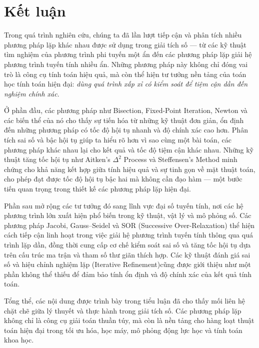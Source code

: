 \chapter*{Kết luận}
\label{chap:conclusion}

Trong quá trình nghiên cứu, chúng ta đã lần lượt tiếp cận và phân tích 
nhiều phương pháp lặp khác nhau được sử dụng trong giải tích số — từ các kỹ thuật tìm nghiệm của phương trình phi tuyến một ẩn đến các phương pháp lặp giải hệ phương trình tuyến tính nhiều ẩn.  
Những phương pháp này không chỉ đóng vai trò là công cụ tính toán hiệu quả, mà còn thể hiện tư tưởng nền tảng của toán học tính toán hiện đại: 
\textit{dùng quá trình xấp xỉ có kiểm soát để tiệm cận dần đến nghiệm chính xác}.

Ở phần đầu, các phương pháp như Bisection, Fixed-Point Iteration, Newton và các biến thể của nó cho thấy sự tiến hóa từ những kỹ thuật đơn giản, ổn định đến những phương pháp có tốc độ hội tụ nhanh và độ chính xác cao hơn.
Phân tích sai số và bậc hội tụ giúp ta hiểu rõ hơn vì sao cùng một bài toán, các phương pháp khác nhau lại cho kết quả và tốc độ tiệm cận khác nhau.  
Những kỹ thuật tăng tốc hội tụ như Aitken’s $\Delta^2$ Process và Steffensen’s Method minh chứng cho khả năng kết hợp giữa tính hiệu quả và sự tinh gọn về mặt thuật toán, cho phép đạt được tốc độ hội tụ bậc hai mà không cần đạo hàm — một bước tiến quan trọng trong thiết kế các phương pháp lặp hiện đại.

Phần sau mở rộng các tư tưởng đó sang lĩnh vực đại số tuyến tính,
nơi các hệ phương trình lớn xuất hiện phổ biến trong kỹ thuật, vật lý và mô phỏng số.
Các phương pháp Jacobi, Gauss–Seidel và SOR (Successive Over-Relaxation) 
thể hiện cách tiếp cận linh hoạt trong việc giải hệ phương trình tuyến tính thông qua quá trình lặp dần, đồng thời cung cấp cơ chế kiểm soát sai số và tăng tốc hội tụ dựa trên cấu trúc ma trận và tham số thư giãn thích hợp.
Các kỹ thuật đánh giá sai số và hiệu chỉnh nghiệm lặp (Iterative Refinement)cũng được giới thiệu như một phần không thể thiếu để đảm bảo tính ổn định và độ chính xác của kết quả tính toán.

Tổng thể, các nội dung được trình bày trong tiểu luận 
đã cho thấy mối liên hệ chặt chẽ giữa lý thuyết và thực hành trong giải tích số.  
Các phương pháp lặp không chỉ là công cụ giải toán thuần túy, 
mà còn là nền tảng cho hàng loạt thuật toán hiện đại 
trong tối ưu hóa, học máy, mô phỏng động lực học và tính toán khoa học.

